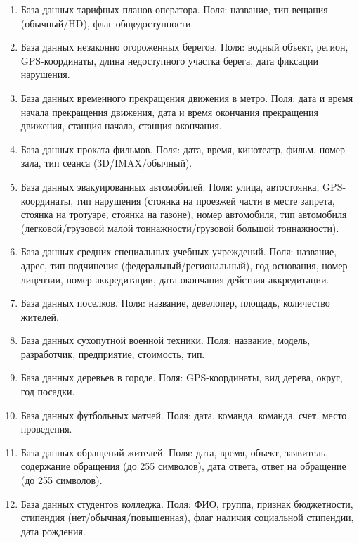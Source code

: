 \documentclass{article}
\begin{document}
\begin{enumerate}
    \item
    База данных тарифных планов оператора. Поля: название,
    тип вещания (обычный/HD), флаг общедоступности.

    \item
    База данных незаконно огороженных берегов. Поля: водный объект,
    регион, GPS-координаты, длина недоступного участка берега,
    дата фиксации нарушения.

    \item
    База данных временного прекращения движения в метро. Поля:
    дата и время начала прекращения движения,
    дата и время окончания прекращения движения,
    станция начала, станция окончания.

    \item
    База данных проката фильмов. Поля: дата, время, кинотеатр,
    фильм, номер зала, тип сеанса (3D/IMAX/обычный).

    \item
    База данных эвакуированных автомобилей. Поля: улица, автостоянка,
    GPS-координаты, тип нарушения (стоянка на проезжей части в месте запрета,
    стоянка на тротуаре, стоянка на газоне), номер автомобиля,
    тип автомобиля (легковой/грузовой малой тоннажности/грузовой большой
    тоннажности).

    \item
    База данных средних специальных учебных учреждений. Поля: название,
    адрес, тип подчинения (федеральный/региональный), год основания,
    номер лицензии, номер аккредитации, дата окончания действия аккредитации.

    \item
    База данных поселков. Поля: название, девелопер, площадь,
    количество жителей.

    \item
    База данных сухопутной военной техники. Поля: название, модель,
    разработчик, предприятие, стоимость, тип.

    \item
    База данных деревьев в городе. Поля: GPS-координаты, вид дерева,
    округ, год посадки.

    \item
    База данных футбольных матчей. Поля: дата, команда, команда,
    счет, место проведения.

    \item
    База данных обращений жителей. Поля: дата, время, объект, заявитель,
    содержание обращения (до 255 символов), дата ответа,
    ответ на обращение (до 255 символов).

    \item
    База данных студентов колледжа. Поля: ФИО, группа,
    признак бюджетности, стипендия (нет/обычная/повышенная),
    флаг наличия социальной стипендии, дата рождения.

\end{enumerate}
\end{document}
